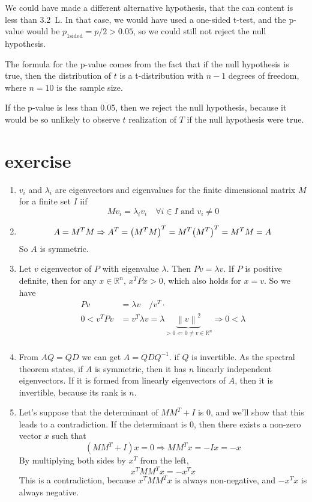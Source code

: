 \documentclass{article}
\begin{document}
We could have made a different alternative hypothesis,
that the can content is less than \qty{3.2}{\liter}.
In that case, we would have used a one-sided t-test,
and the p-value would be $p_\text{1sided} = p/2 >0.05$,
so we could still not reject the null hypothesis.

The formula for the p-value comes from the fact that
if the null hypothesis is true,
then the distribution of $t$ is a t-distribution with $n-1$ degrees of freedom,
where $n=10$ is the sample size.

If the p-value is less than 0.05,
then we reject the null hypothesis,
because it would be so unlikely to observe $t$ realization of $T$ if the null hypothesis were true.

\section{exercise}
\begin{enumerate}[label=(\alph*)]
    \item $v_i$ and $\lambda_i$ are eigenvectors and eigenvalues for the
          finite dimensional matrix $M$ for a finite set $I$ iif
          \[M{v_i} = {\lambda _i}{v_i}\quad\forall i\in I\text{ and }v_i\not =0\]
    \item
          \[
              A = {M^T}M \Rightarrow {A^T} = {\left( {{M^T}M} \right)^T} = {M^T}{\left( {{M^T}} \right)^T} = {M^T}M = A \hfill \\
          \]
          So $A$ is symmetric.
    \item Let $v$ eigenvector of $P$ with eigenvalue $\lambda$.
          Then $Pv = \lambda v$. If $P$ is positive definite,
          then for any $x \in \mathbb{R}^n$,
          $x^T P x > 0$, which also holds for $x=v$.
          So we have
          \[\begin{aligned}
                  Pv          & = \lambda v\quad /{v^T} \cdot                                                                                                          \\
                  0 < {v^T}Pv & = {v^T}\lambda v = \lambda \underbrace {{{\left\| v \right\|}^2}}_{ > 0 \Leftarrow 0 \ne v \in {\mathbb{R}^n}} \Rightarrow 0 < \lambda \\
              \end{aligned} \]
    \item From $AQ=QD$ we can get $A=QDQ^{-1}$.
          if $Q$ is invertible.
          As the spectral theorem states,
          if $A$ is symmetric, then it has $n$ linearly independent eigenvectors.
          If it is formed from linearly eigenvectors of $A$,
          then it is invertible, because its rank is $n$.
    \item Let's suppose that the determinant of $MM^T+I$ is 0,
          and we'll show that this leads to a contradiction.
          If the determinant is 0, then there exists a non-zero vector $x$ such that
          \[(MM^T + I)x = 0\Rightarrow MM^Tx = -Ix = -x\]
          By multiplying both sides by $x^T$ from the left,
          \[x^TMM^Tx = -x^Tx\]
          This is a contradiction, because $x^TMM^Tx$ is always non-negative,
          and $-x^Tx$ is always negative.
\end{enumerate}
\end{document}
